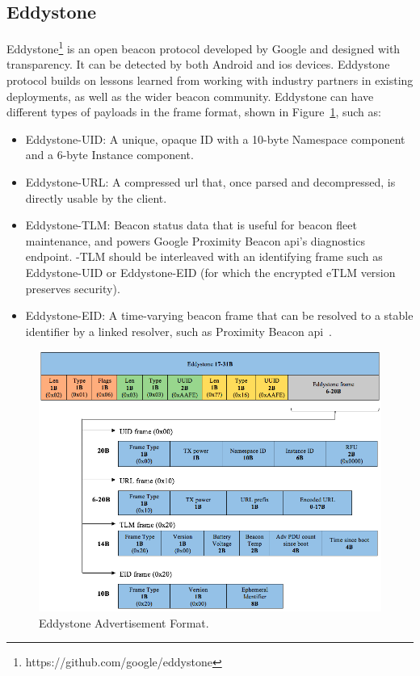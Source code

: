 \subsection{Eddystone}
\label{subsection:eddystone}
Eddystone\footnote{https://github.com/google/eddystone} is an open beacon protocol developed by Google and designed with transparency. It can be detected by both Android and \gls{ios} devices. Eddystone protocol builds on lessons learned from working with industry partners in existing deployments, as well as the wider beacon community. Eddystone can have different types of payloads in the frame format, shown in Figure~\ref{fig:eddystoneadv}, such as:
\begin{itemize}
\item Eddystone-UID: A unique, opaque ID with a 10-byte Namespace component and a 6-byte Instance component. 
\item Eddystone-URL: A compressed \gls{url} that, once parsed and decompressed, is directly usable by the client. 
\item Eddystone-TLM: Beacon status data that is useful for beacon fleet maintenance, and powers Google Proximity Beacon \gls{api}'s diagnostics endpoint. -TLM should be interleaved with an identifying frame such as Eddystone-UID or Eddystone-EID (for which the encrypted eTLM version preserves security). 
\item Eddystone-EID: A time-varying beacon frame that can be resolved to a stable identifier by a linked resolver, such as Proximity Beacon \gls{api}~\citep{campus_survey}. 
\end{itemize}

\begin{figure}[!htb]
  \centering
  \includegraphics[width=1\textwidth]{Figures/eddystone_v3.png}
  \caption[Eddystone Advertisement Format]{Eddystone Advertisement Format.}
  \label{fig:eddystoneadv}
\end{figure}

